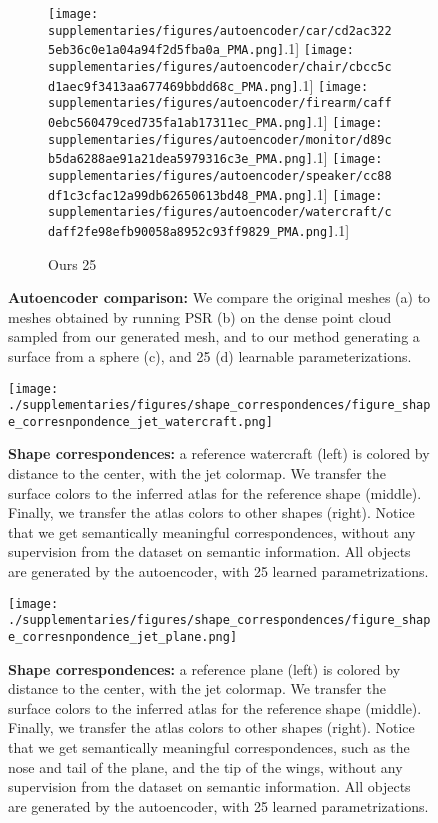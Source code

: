 \documentclass[10pt,twocolumn,letterpaper]{article}
\begin{document}
\begin{figure*}[t!]
\begin{subfigure}[b]{0.24\linewidth}
 \texttt{[image: supplementaries/figures/autoencoder/car/cd2ac3225eb36c0e1a04a94f2d5fba0a\_PMA.png]}\0.1\linewidth]
 \texttt{[image: supplementaries/figures/autoencoder/chair/cbcc5cd1aec9f3413aa677469bbdd68c\_PMA.png]}\0.1\linewidth]
 \texttt{[image: supplementaries/figures/autoencoder/firearm/caff0ebc560479ced735fa1ab17311ec\_PMA.png]}\0.1\linewidth]
 \texttt{[image: supplementaries/figures/autoencoder/monitor/d89cb5da6288ae91a21dea5979316c3e\_PMA.png]}\0.1\linewidth]
 \texttt{[image: supplementaries/figures/autoencoder/speaker/cc88df1c3cfac12a99db62650613bd48\_PMA.png]}\0.1\linewidth]
 \texttt{[image: supplementaries/figures/autoencoder/watercraft/cdaff2fe98efb90058a8952c93ff9829\_PMA.png]}\0.1\linewidth]
\caption{Ours 25}
\end{subfigure}
\caption{
{\bf Autoencoder comparison:}
We compare the original meshes (a) to meshes obtained by running PSR (b) on the dense point cloud sampled from our generated mesh,  and to our method generating a surface from a sphere (c), and 25 (d) learnable parameterizations.} \vspace{-10ptpt}
  \label{fig:svr_comparison_2}
\end{figure*}


\newpage
\begin{figure*}[t]
 \texttt{[image: ./supplementaries/figures/shape\_correspondences/figure\_shape\_corresnpondence\_jet\_watercraft.png]}
\caption{{\bf Shape correspondences:} a reference watercraft (left) is colored by distance to the center, with the jet colormap. We transfer the surface colors to the inferred atlas for the reference shape (middle). Finally, we transfer the atlas colors to other shapes (right). Notice that we get semantically meaningful correspondences, without any supervision from the dataset on semantic information. All objects are generated by the autoencoder, with 25 learned parametrizations.\label{fig:corresp_1}}
\end{figure*}
\begin{figure*}[b]
 \texttt{[image: ./supplementaries/figures/shape\_correspondences/figure\_shape\_corresnpondence\_jet\_plane.png]}
\caption{{\bf Shape correspondences:} a reference plane (left) is colored by distance to the center, with the jet colormap. We transfer the surface colors to the inferred atlas for the reference shape (middle). Finally, we transfer the atlas colors to other shapes (right). Notice that we get semantically meaningful correspondences, such as the nose and tail of the plane, and the tip of the wings, without any supervision from the dataset on semantic information. All objects are generated by the autoencoder, with 25 learned parametrizations.\label{fig:corresp_2}}
\end{figure*}
\end{document}
